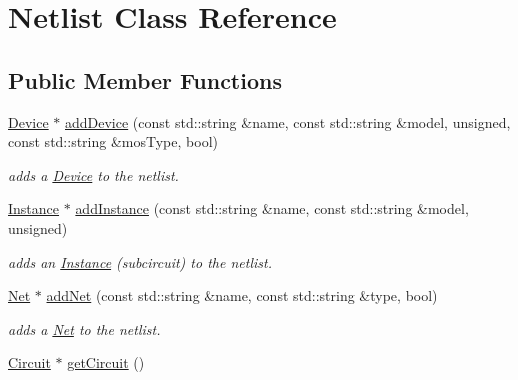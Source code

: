 \hypertarget{class_open_chams_1_1_netlist}{\section{Netlist Class Reference}
\label{class_open_chams_1_1_netlist}
}
\subsection*{Public Member Functions}
\begin{DoxyCompactItemize}
\item 
\hyperlink{class_open_chams_1_1_device}{Device} $\ast$ \hyperlink{class_open_chams_1_1_netlist_a8e1798a2516c32fbab629ce8d60d4b1d}{add\-Device} (const std\-::string \&name, const std\-::string \&model, unsigned, const std\-::string \&mos\-Type, bool)
\begin{DoxyCompactList}\small\item\em adds a \hyperlink{class_open_chams_1_1_device}{Device} to the netlist. \end{DoxyCompactList}\item 
\hyperlink{class_open_chams_1_1_instance}{Instance} $\ast$ \hyperlink{class_open_chams_1_1_netlist_af0fb73e5e8589a64d13b6d8104a34a03}{add\-Instance} (const std\-::string \&name, const std\-::string \&model, unsigned)
\begin{DoxyCompactList}\small\item\em adds an \hyperlink{class_open_chams_1_1_instance}{Instance} (subcircuit) to the netlist. \end{DoxyCompactList}\item 
\hyperlink{class_open_chams_1_1_net}{Net} $\ast$ \hyperlink{class_open_chams_1_1_netlist_a52be455a704925328843770552eca43d}{add\-Net} (const std\-::string \&name, const std\-::string \&type, bool)
\begin{DoxyCompactList}\small\item\em adds a \hyperlink{class_open_chams_1_1_net}{Net} to the netlist. \end{DoxyCompactList}\item 
\hypertarget{class_open_chams_1_1_netlist_a01673b4356977793545c5f3a55ceaba5}{\hyperlink{class_open_chams_1_1_circuit}{Circuit} $\ast$ \hyperlink{class_open_chams_1_1_netlist_a01673b4356977793545c5f3a55ceaba5}{get\-Circuit} ()}\label{class_open_chams_1_1_netlist_a01673b4356977793545c5f3a55ceaba5}


\end{DoxyCompactItemize}
